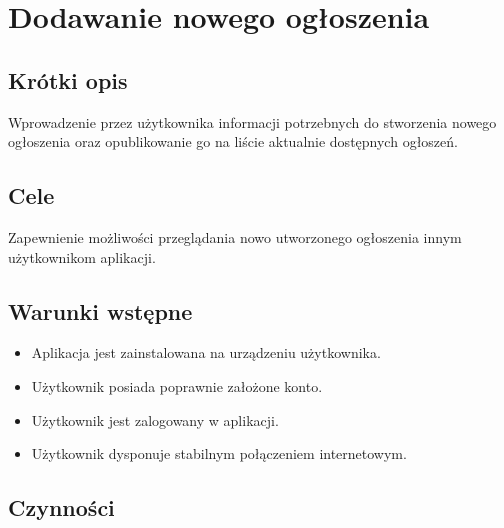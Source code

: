 \documentclass[licencjacka]{pracamgr}
\begin{document}
\section{Dodawanie nowego ogłoszenia}
    \subsection{Krótki opis}
    Wprowadzenie przez użytkownika informacji potrzebnych do stworzenia nowego ogłoszenia oraz opublikowanie go na liście aktualnie dostępnych
    ogłoszeń.
    \subsection{Cele}
    Zapewnienie możliwości przeglądania nowo utworzonego ogłoszenia innym użytkownikom aplikacji.
    \subsection{Warunki wstępne}
    \begin{itemize}
        \item Aplikacja jest zainstalowana na urządzeniu użytkownika.
        \item Użytkownik posiada poprawnie założone konto.
        \item Użytkownik jest zalogowany w aplikacji.
        \item Użytkownik dysponuje stabilnym połączeniem internetowym.
    \end{itemize}
    \subsection{Czynności}
\end{document}
